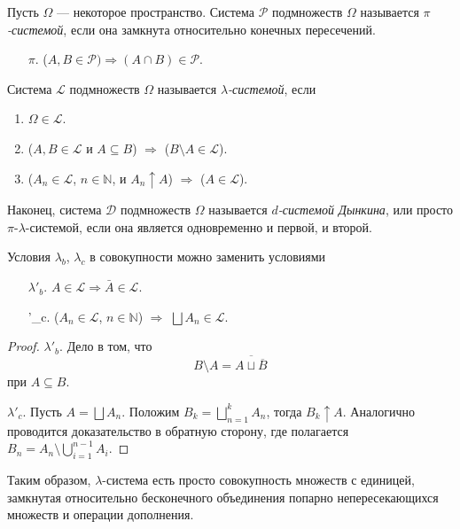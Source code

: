 \begin{definition}
  Пусть $ \Omega $ --- некоторое пространство. Система $ \mathscr P $
  подмножеств $ \Omega $ называется \emph{$ \pi $-системой}, если она замкнута
  относительно конечных пересечений.
  \begin{enumerate}
    \item[$\pi.$] ($ A, B \in \mathscr P) \Rightarrow (A \cap B) \in \mathscr P
      $.
  \end{enumerate}

  Система $ \mathscr L $ подмножеств $ \Omega $ называется \emph{$ \lambda
  $-системой}, если 
  \begin{enumerate}[label=$ \lambda_\alph* $.]
    \item $ \Omega \in \mathscr L $.
    \item ($ A, B \in \mathscr L $ и $ A \subseteq B $) $ \Rightarrow $ ($ B
      \setminus A \in \mathscr L$).
    \item\label{enum:lam3} ($ A_n \in \mathscr L $, $ n \in \mathbb N $, и $ A_n \uparrow A $) $
      \Rightarrow $ ($ A \in \mathscr L $).
  \end{enumerate}

  Наконец, система $ \mathscr D $ подмножеств $ \Omega $ называется \emph{$ d
  $-системой Дынкина}, или просто $ \pi $-$ \lambda $-системой, если она
  является одновременно и первой, и второй.
\end{definition}
\begin{remark*}
  Условия $ \lambda_b $, $ \lambda_c $ в совокупности можно заменить
  условиями
  \begin{enumerate}
    \item[$ \lambda'_b. $]\label{enum:lam2bis} $ A \in \mathscr L \Rightarrow \bar A\in\mathscr L $.
    \item[\lambda'_c.] ($ A_n \in \mathscr L $, $ n\in\mathbb N $) $ \Rightarrow
      $ $ \bigsqcup A_n \in \mathscr L $.
  \end{enumerate}
  \begin{proof}
  $ \lambda'_b $. Дело в том,
    что  
    \[
      B \setminus A = \overline{A\sqcup \overline B}
    \]
    при $ A \subseteq B $.
    
    $ \lambda'_c $. Пусть $ A = \bigsqcup A_n $. Положим $ B_k =
    \bigsqcup\limits_{n=1}^k A_n $,
    тогда $ B_k \uparrow A $. Аналогично проводится доказательство в обратную
    сторону, где полагается $ B_n = A_n \setminus \bigcup\limits_{i=1}^{n-1} A_i $.
  \end{proof}
\end{remark*}
Таким образом, $ \lambda $-система есть просто совокупность множеств с единицей,
замкнутая относительно бесконечного объединения попарно непересекающихся множеств
и операции дополнения.

